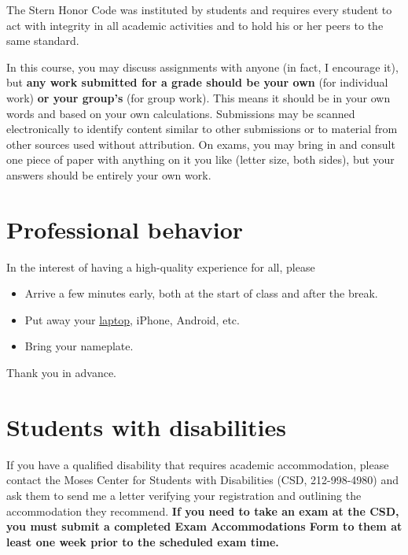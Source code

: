 \documentclass[12pt]{article}
\begin{document}
The Stern Honor Code was instituted by students
and requires every student to act with integrity in all
academic activities and to hold his or her peers to the same
standard.

In this course, you may discuss assignments with anyone
(in fact, I encourage it), but {\bf any work submitted for a
grade should be your own} (for individual work) {\bf or your group's}
(for group work).
This means it should be in your own words and based on your own calculations.
Submissions may be scanned electronically to identify
content similar to other submissions or to material from other sources
used without attribution.
On exams, you may bring in and consult one piece
of paper with anything on it you like (letter size, both sides),
but your answers should be entirely your own work.




\section{Professional behavior}

In the interest of having a high-quality experience for all,
please
%
\begin{itemize}
\item Arrive a few minutes early,
both at the start of class and after the break.

\item Put away your 
\href{http://marginalrevolution.com/marginalrevolution/2015/04/why-you-should-take-notes-by-hand-not-on-a-laptop.html}
{laptop},
iPhone, Android, etc.

\item Bring your nameplate.

%
\end{itemize}
Thank you in advance.


\section{Students with disabilities}

If you have a qualified disability that requires academic accommodation,
please contact the Moses Center for Students with Disabilities (CSD, 212-998-4980) and ask them to
send me a letter verifying your registration and outlining the accommodation they recommend.
{\bf If you need to take an exam at the CSD,
you must submit a completed Exam Accommodations Form to them
at least one week prior to the scheduled exam time.}


\end{document}
